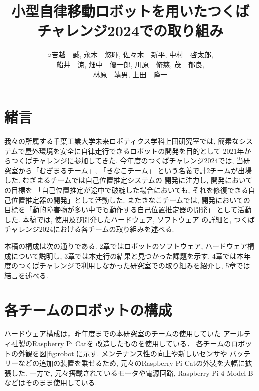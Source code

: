 \documentclass[twocolumn,9pt]{jsproceedings}
\title{小型自律移動ロボットを用いたつくばチャレンジ2024での取り組み}
\author{○吉越　誠\authorrefmark{2}, 永木　悠暉\authorrefmark{1}, 佐々木　新平\authorrefmark{1}, 中村　啓太郎\authorrefmark{1}, 
\\船井　涼\authorrefmark{2}, 畑中　優一郎\authorrefmark{2}, 川原　脩慈\authorrefmark{1}, 茂　郁良\authorrefmark{1}, 
\\林原　靖男\authorrefmark{1}, 上田　隆一\authorrefmark{1}}
\affiliation{千葉工業大学 未来ロボティクス学科 上田研究室 むぎまるチーム/きなこチーム}
\begin{document}
\maketitle


\section{緒言}

我々の所属する千葉工業大学未来ロボティクス学科上田研究室では, 
簡素なシステムで屋外環境を安全に自律走行できるロボットの開発を目的として
2021年からつくばチャレンジに参加してきた. 
今年度のつくばチャレンジ2024では, 
当研究室から「むぎまるチーム」, 「きなこチーム」
という名義で計2チームが出場した. 
むぎまるチームでは自己位置推定システムの
開発に注力し, 開発においての目標を
「自己位置推定が途中で破綻した場合においても, 
それを修復できる自己位置推定器の開発」として活動した. 
またきなこチームでは, 
開発においての目標を「動的障害物が多い中でも動作する自己位置推定器の開発」
として活動した. 
本稿では, 使用及び開発したハードウェア, ソフトウェア
の詳細と, つくばチャレンジ2024における各チームの取り組みを述べる. 

本稿の構成は次の通りである. 
2章ではロボットのソフトウェア, ハードウェア構成について説明し, 
3章では本走行の結果と見つかった課題を示す. 
4章では本年度のつくばチャレンジで利用しなかった研究室での取り組みを紹介し, 
5章では結言を述べる. 

\section{各チームのロボットの構成}
ハードウェア構成は，昨年度までの本研究室のチームの使用していた
アールティ社製のRaspberry Pi Cat\cite{RTshop}を
改造したものを使用している．
各チームのロボットの外観を図\ref{fig:robot}に示す. 
メンテナンス性の向上や新しいセンサや
バッテリーなどの追加の装置を乗せるため, 
元々のRaspberry Pi Catの外装を大幅に拡張した. 
一方で, 元々搭載されているモータや電源回路, 
Raspberry Pi 4 Model Bなどはそのまま使用している. 
\end{document}
